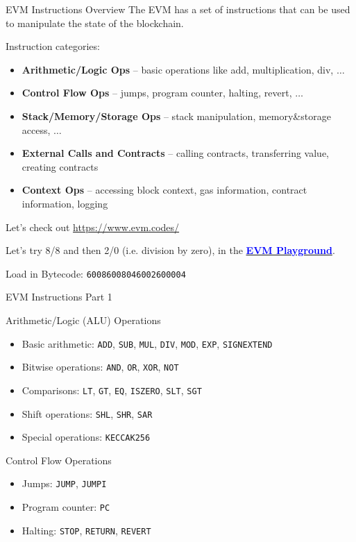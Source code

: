 \documentclass[aspectratio=169]{beamer}
\newcommand{\bluelink}[2]{\href{#1}{\textcolor{blue}{\textbf{#2}}}}
\begin{document}
\begin{frame}{EVM Instructions Overview}
The EVM has a set of instructions that can be used to manipulate the state of the
blockchain.
\smallskip

Instruction categories:
\begin{itemize}
    \item \textbf{Arithmetic/Logic Ops} -- basic operations like add, multiplication, div, $\ldots$
    \item \textbf{Control Flow Ops} -- jumps, program counter, halting, revert, $\ldots$
    \item \textbf{Stack/Memory/Storage Ops} -- stack manipulation, memory\&storage access, $\ldots$
    \item \textbf{External Calls and Contracts} -- calling contracts, transferring value, creating contracts
    \item \textbf{Context Ops} -- accessing block context, gas information, contract information, logging
\end{itemize}
\bigskip

Let's check out \url{https://www.evm.codes/}
\bigskip

Let's try 8/8 and then 2/0 (i.e. division by zero), in the \bluelink{https://www.evm.codes/playground}{EVM Playground}.

Load in Bytecode: \texttt{60086008046002600004}
\end{frame}

\begin{frame}{EVM Instructions Part 1}

\begin{block}{Arithmetic/Logic (ALU) Operations}
\begin{itemize}
    \item Basic arithmetic: \texttt{ADD}, \texttt{SUB}, \texttt{MUL}, \texttt{DIV}, \texttt{MOD}, \texttt{EXP}, \texttt{SIGNEXTEND}
    \item Bitwise operations: \texttt{AND}, \texttt{OR}, \texttt{XOR}, \texttt{NOT}
    \item Comparisons: \texttt{LT}, \texttt{GT}, \texttt{EQ}, \texttt{ISZERO}, \texttt{SLT}, \texttt{SGT}
    \item Shift operations: \texttt{SHL}, \texttt{SHR}, \texttt{SAR}
    \item Special operations: \texttt{KECCAK256}
\end{itemize}
\end{block}

\begin{block}{Control Flow Operations}
\begin{itemize}
    \item Jumps: \texttt{JUMP}, \texttt{JUMPI}
    \item Program counter: \texttt{PC}
    \item Halting: \texttt{STOP}, \texttt{RETURN}, \texttt{REVERT}
\end{itemize}
\end{block}
\end{frame}
\end{document}

